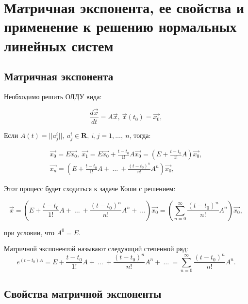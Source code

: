 



\section{Матричная экспонента, ее свойства и применение к решению нормальных линейных систем}

\subsection{Матричная экспонента}
Необходимо решить ОЛДУ вида:

\begin{equation*}
  	\frac{d\vec{x}}{dt} = A\vec{x},\ \vec{x}(t_0) = \vec{x_0},
  	\label{Issue5_1}
\end{equation*}

Если $A(t) = ||a_j^i||,\ a_j^i \in \mathbf{R},\ i,j = 1,\dots,\ n$, тогда:

\begin{equation*}
\begin{gathered}
         \vec{x_{0}} = E\vec{x_0},\ \vec{x_1} = E\vec{x_0} + \frac{t-t_0}{1!}A\vec{x_0} = \left(E + \frac{t-t_0}{1!}A\right) \vec{x_0}, \\  
         \vec{x_n} = \left(E + \frac{t-t_0}{1!}A +\ \dots\ + \frac{(t-t_0)^n}{n!}A^n\right)\vec{x_0},	 
\end{gathered}
\end{equation*}

Этот процесс будет сходиться к задаче Коши с решением:

\begin{equation*}
   	\vec{x} = \left(E + \frac{t-t_0}{1!}A +\ \dots\ + \frac{(t-t_0)^n}{n!}A^n+\ \dots \right)\vec{x_0} = \left(\sum\limits_{n = 0}^{\infty} \frac{(t-t_0)^n}{n!}A^n\right)\vec{x_0},	 
\end{equation*}

при условии, что $A^0 = E.$

\begin{definition}
	Матричной экспонентой называют следующий степенной ряд:
	\begin{equation*}
		e^{(t-t_0)A} = E + \frac{t-t_0}{1!}A +\ \dots\ + \frac{(t-t_0)^n}{n!}A^n+\ \dots\ = \sum\limits_{n = 0}^{\infty} \frac{(t-t_0)^n}{n!}A^n.
	\end{equation*}
\end{definition}

\subsection{Свойства матричной экспоненты}

